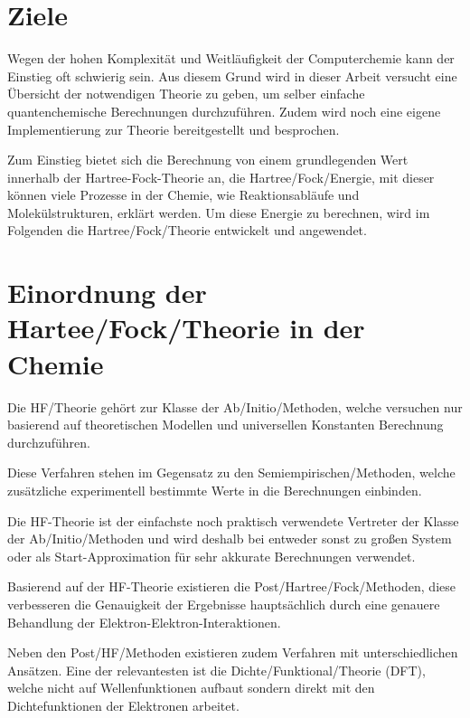 \section{Ziele}
Wegen der hohen Komplexität und Weitläufigkeit der Computerchemie
kann der Einstieg oft schwierig sein. Aus diesem Grund wird
in dieser Arbeit versucht eine Übersicht der notwendigen Theorie zu geben,
um selber einfache quantenchemische Berechnungen durchzuführen.
Zudem wird noch eine eigene Implementierung
zur Theorie bereitgestellt und besprochen.

Zum Einstieg bietet sich die Berechnung von einem grundlegenden Wert
innerhalb der Hartree-Fock-Theorie an, die Hartree\-/Fock\-/Energie, 
mit dieser können viele Prozesse in der Chemie,
wie Reaktionsabläufe und Molekülstrukturen, erklärt werden.
Um diese Energie zu berechnen, wird im Folgenden
die Hartree\-/Fock\-/Theorie entwickelt und angewendet.


\section{Einordnung der Hartee\-/Fock\-/Theorie in der Chemie} \label{posthf}
Die HF\-/Theorie gehört zur Klasse der Ab\-/Initio\-/Methoden,
welche versuchen nur basierend auf theoretischen Modellen und
universellen Konstanten Berechnung durchzuführen.
\cite[5.1, 5.2.2]{lewars_2016}

Diese Verfahren stehen im Gegensatz zu den Semiempirischen\-/Methoden,
welche zusätzliche experimentell bestimmte Werte in die Berechnungen einbinden.
\cite[S. 421]{lewars_2016}

Die HF-Theorie ist der einfachste noch praktisch verwendete Vertreter
der Klasse der Ab\-/Initio\-/Methoden
und wird deshalb bei entweder sonst zu großen System oder
als Start-Approximation für sehr akkurate Berechnungen verwendet.
\cite[S. 433]{structure_2013}

Basierend auf der HF-Theorie existieren die Post\-/Hartree\-/Fock\-/Methoden,
diese verbesseren die Genauigkeit der Ergebnisse hauptsächlich
durch eine genauere Behandlung der Elektron-Elektron-Interaktionen.
\cite[5.4]{lewars_2016}

Neben den Post\-/HF\-/Methoden existieren zudem Verfahren
mit unterschiedlichen Ansätzen. Eine der relevantesten ist
die Dichte\-/Funktional\-/Theorie (DFT), welche nicht auf
Wellenfunktionen aufbaut sondern direkt mit den
Dichtefunktionen der Elektronen arbeitet.
\cite[7.1]{lewars_2016}